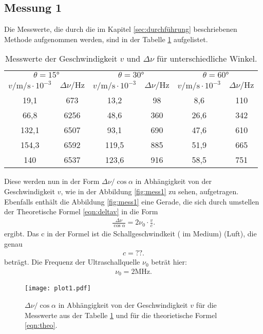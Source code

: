 \subsection{Messung 1}
Die Messwerte, die durch die im Kapitel \ref{sec:durchführung} beschriebenen Methode
aufgenommen werden, sind in der Tabelle \ref{tab:mess1} aufgelistet.
\begin{table}
  \centering
  \caption{Messwerte der Geschwindigkeit $v$ und $\Delta\nu$ für unterschiedliche Winkel.}
  \label{tab:mess1}
  \begin{tabular}{c c c c c c}
    \toprule
    \multicolumn{2}{c}{ $\theta=15\si{\degree}$ } &  \multicolumn{2}{c}{ $\theta=30\si{\degree}$ } & \multicolumn{2}{c}{ $\theta=60\si{\degree}$ } \\
    $v/\si{\meter\per\second}\cdot10^{-3}$ & $\Delta\nu/\si{\hertz}$ & $v/\si{\meter\per\second}\cdot10^{-3}$ & $\Delta\nu/\si{\hertz}$ & $v/\si{\meter\per\second}\cdot10^{-3}$ & $\Delta\nu/\si{\hertz}$ \\
    \midrule
    19,1  & 673  & 13,2  & 98  & 8,6  & 110\\
    66,8  & 6256 & 48,6  & 360 & 26,6 & 342\\
    132,1 & 6507 & 93,1  & 690 & 47,6 & 610\\
    154,3 & 6592 & 119,5 & 885 & 51,9 & 665\\
    140   & 6537 & 123,6 & 916 & 58,5 & 751\\
    \bottomrule
  \end{tabular}
\end{table}
\FloatBarrier
Diese werden nun in der Form $\Delta\nu/\cos\alpha$ in Abhängigkeit von der Geschwindigkeit $v$, wie in der Abbildung \ref{fig:mess1} zu sehen, aufgetragen.
Ebenfalls enthält die Abbildung \ref{fig:mess1} eine Gerade, die sich durch umstellen der Theoretische Formel \eqref{eqn:deltav} in die Form
\begin{align}
  \frac{\Delta\nu}{\cos{\alpha}}=2\nu_0\cdot\frac{v}{c}.\label{eqn:theo}
\end{align}
ergibt. Das c in der Formel ist die Schallgeschwindkeit ( im  Medium) (Luft), die genau
\begin{align}
  c=??.
\end{align}
beträgt. Die Frequenz der Ultraschallquelle $\nu_0$ beträt hier:
\begin{align}
  \nu_0=2\si{\mega\hertz}.
\end{align}
\FloatBarrier
\begin{figure}
  \texttt{[image: plot1.pdf]}
  \centering
   \caption{$\Delta\nu/\cos\alpha$ in Abhängigkeit von der Geschwindigkeit $v$ für die Messwerte aus der Tabelle \ref{tab:mess1} und für die theorietische Formel \eqref{eqn:theo}.}
  \label{fig:plot}
\end{figure}

